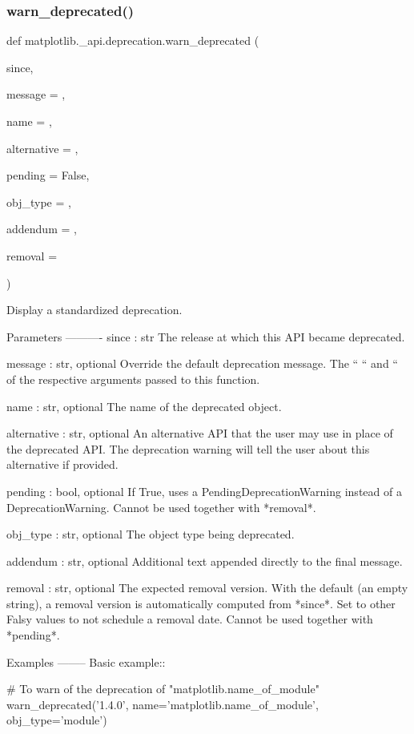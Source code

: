 \subsubsection{\texorpdfstring{warn\+\_\+deprecated()}{warn\_deprecated()}}
{\footnotesize\ttfamily def matplotlib.\+\_\+api.\+deprecation.\+warn\+\_\+deprecated (\begin{DoxyParamCaption}\item[{}]{since,  }\item[{}]{message = {\ttfamily \textquotesingle{}\textquotesingle{}},  }\item[{}]{name = {\ttfamily \textquotesingle{}\textquotesingle{}},  }\item[{}]{alternative = {\ttfamily \textquotesingle{}\textquotesingle{}},  }\item[{}]{pending = {\ttfamily False},  }\item[{}]{obj\+\_\+type = {\ttfamily \textquotesingle{}\textquotesingle{}},  }\item[{}]{addendum = {\ttfamily \textquotesingle{}\textquotesingle{}},  }\item[{}]{removal = {\ttfamily \textquotesingle{}\textquotesingle{}} }\end{DoxyParamCaption})}

\begin{DoxyVerb}Display a standardized deprecation.

Parameters
----------
since : str
    The release at which this API became deprecated.

message : str, optional
    Override the default deprecation message.  The ``%
    ``%
    and ``%
    of the respective arguments passed to this function.

name : str, optional
    The name of the deprecated object.

alternative : str, optional
    An alternative API that the user may use in place of the deprecated
    API.  The deprecation warning will tell the user about this alternative
    if provided.

pending : bool, optional
    If True, uses a PendingDeprecationWarning instead of a
    DeprecationWarning.  Cannot be used together with *removal*.

obj_type : str, optional
    The object type being deprecated.

addendum : str, optional
    Additional text appended directly to the final message.

removal : str, optional
    The expected removal version.  With the default (an empty string), a
    removal version is automatically computed from *since*.  Set to other
    Falsy values to not schedule a removal date.  Cannot be used together
    with *pending*.

Examples
--------
Basic example::

    # To warn of the deprecation of "matplotlib.name_of_module"
    warn_deprecated('1.4.0', name='matplotlib.name_of_module',
                    obj_type='module')
\end{DoxyVerb}
 

